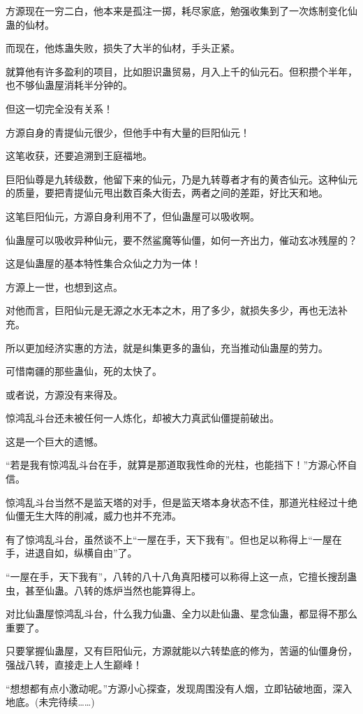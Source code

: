 \begin{this_body}
方源现在一穷二白，他本来是孤注一掷，耗尽家底，勉强收集到了一次炼制变化仙蛊的仙材。

而现在，他炼蛊失败，损失了大半的仙材，手头正紧。

就算他有许多盈利的项目，比如胆识蛊贸易，月入上千的仙元石。但积攒个半年，也不够仙蛊屋消耗半分钟的。

但这一切完全没有关系！

方源自身的青提仙元很少，但他手中有大量的巨阳仙元！

这笔收获，还要追溯到王庭福地。

巨阳仙尊是九转级数，他留下来的仙元，乃是九转尊者才有的黄杏仙元。这种仙元的质量，要把青提仙元甩出数百条大街去，两者之间的差距，好比天和地。

这笔巨阳仙元，方源自身利用不了，但仙蛊屋可以吸收啊。

仙蛊屋可以吸收异种仙元，要不然鲨魔等仙僵，如何一齐出力，催动玄冰残屋的？

这是仙蛊屋的基本特性集合众仙之力为一体！

方源上一世，也想到这点。

对他而言，巨阳仙元是无源之水无本之木，用了多少，就损失多少，再也无法补充。

所以更加经济实惠的方法，就是纠集更多的蛊仙，充当推动仙蛊屋的劳力。

可惜南疆的那些蛊仙，死的太快了。

或者说，方源没有来得及。

惊鸿乱斗台还未被任何一人炼化，却被大力真武仙僵提前破出。

这是一个巨大的遗憾。

“若是我有惊鸿乱斗台在手，就算是那道取我性命的光柱，也能挡下！”方源心怀自信。

惊鸿乱斗台当然不是监天塔的对手，但是监天塔本身状态不佳，那道光柱经过十绝仙僵无生大阵的削减，威力也并不充沛。

有了惊鸿乱斗台，虽然谈不上“一屋在手，天下我有”。但也足以称得上“一屋在手，进退自如，纵横自由”了。

“一屋在手，天下我有”，八转的八十八角真阳楼可以称得上这一点，它擅长搜刮蛊虫，甚至仙蛊。八转的炼炉当然也能算得上。

对比仙蛊屋惊鸿乱斗台，什么我力仙蛊、全力以赴仙蛊、星念仙蛊，都显得不那么重要了。

只要掌握仙蛊屋，又有巨阳仙元，方源就能以六转垫底的修为，苦逼的仙僵身份，强战八转，直接走上人生巅峰！

“想想都有点小激动呢。”方源小心探查，发现周围没有人烟，立即钻破地面，深入地底。(未完待续……)

\end{this_body}

